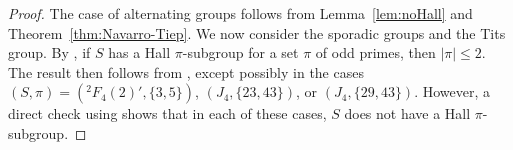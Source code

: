 \documentclass[12pt]{amsart}
\theoremstyle{definition}
\numberwithin{equation}{section}
\begin{document}
\begin{proof}
The %
case of alternating groups follows from Lemma~\ref{lem:noHall}
and Theorem~\ref{thm:Navarro-Tiep}. We now consider the sporadic
groups and the Tits group. By \cite[Theorem~6.14]{G86}, if $S$ has a
Hall $\pi$-subgroup for a set $\pi$ of odd primes, %
then $|\pi| \le
2$. %
The result then follows from \cite[Theorem~2.1]{GHSV21}, except
possibly in the cases $(S,\pi)=({}^2F_4(2)',\{3,5\})$, $(J_4,
\{23,43\})$, or $(J_4,\{29,43\})$. However, a direct check using
\cite{Atl1} shows that %
in each of these cases, %
$S$ does not have a
Hall %
$\pi$-subgroup.
\end{proof}

\end{document}
